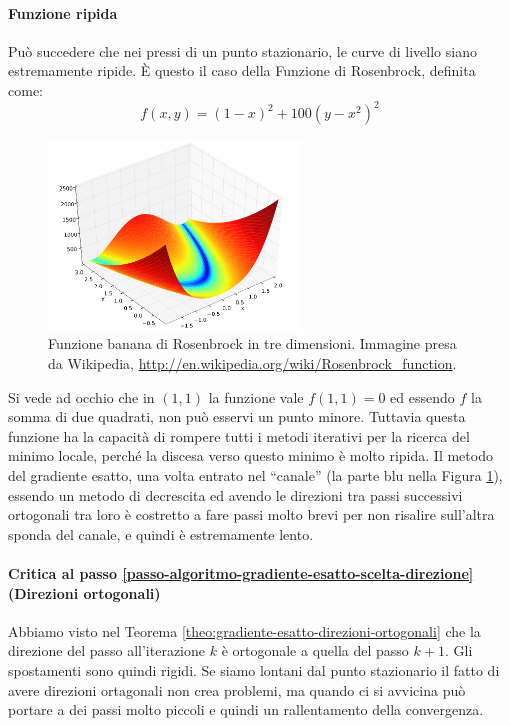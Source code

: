 \paragraph{Funzione ripida} Può succedere che nei pressi di un punto
stazionario, le curve di livello siano estremamente ripide. \`E questo
il caso della Funzione di Rosenbrock, definita come:
\begin{equation}
\label{eq:rosenbrok-banana} f(x,y) = (1-x)^2 + 100(y-x^2)^2
\end{equation}

\begin{figure}[h!]   \centering
    \includegraphics[width=0.60\textwidth]{imgs/rosenbrock-banana.png}
  \caption{Funzione banana di Rosenbrock in tre dimensioni. Immagine
presa da Wikipedia,
\url{http://en.wikipedia.org/wiki/Rosenbrock_function}.}\label{img:rosenbrock-banana}
\end{figure}


Si vede ad occhio che in $(1,1)$ la funzione vale $f(1,1) = 0$ ed
essendo $f$ la somma di due quadrati, non può esservi un punto
minore. Tuttavia questa funzione ha la capacit\`a di rompere tutti i
metodi iterativi per la ricerca del minimo locale, perch\'e la discesa
verso questo minimo \`e molto ripida. Il metodo del gradiente esatto,
una volta entrato nel ``canale'' (la parte blu nella Figura \ref{img:rosenbrock-banana}), essendo
un metodo di decrescita ed avendo le direzioni tra passi successivi
ortogonali tra loro \`e costretto a fare passi molto brevi per non
risalire sull'altra sponda del canale, e quindi \`e estremamente lento.

\paragraph{Critica al passo
\ref{passo-algoritmo-gradiente-esatto-scelta-direzione} (Direzioni
ortogonali)} Abbiamo visto nel Teorema
\ref{theo:gradiente-esatto-direzioni-ortogonali} che la direzione del
passo all'iterazione $k$ \`e ortogonale a quella del passo $k+1$. Gli
spostamenti sono quindi rigidi. Se siamo lontani dal punto stazionario
il fatto di avere direzioni ortagonali non crea problemi, ma quando ci
si avvicina può portare a dei passi molto piccoli e quindi un
rallentamento della convergenza.

